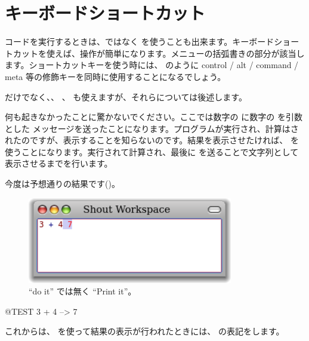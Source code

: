 \documentclass[a4paper,10pt,twoside]{book}
\begin{document}
\section{キーボードショートカット}

コードを実行するときは、\actclick ではなく を使うことも出来ます。キーボードショートカットを使えば、操作が簡単になります。メニューの括弧書きの部分が該当します。ショートカットキーを使う時には、 のように control / alt / command / meta 等の修飾キーを同時に使用することになるでしょう。



 だけでなく、、 、  も使えますが、それらについては後述します。


何も起きなかったことに驚かないでください。ここでは数字の  に数字の  を引数とした \ct{+} メッセージを送ったことになります。プログラムが実行され、計算はされたのですが、表示することを知らないのです。結果を表示させたければ、 を使うことになります。実行されて計算され、最後に  を送ることで文字列として表示させるまでを行います。

今度は予想通りの結果です()。

\begin{figure}[htb]
\centerline {\includegraphics[width=0.8\textwidth]{PrintIt}}
\caption{``do it'' では無く ``Print it''。}
\end{figure}

\begin{code}{@TEST}
3 + 4 --> 7
\end{code}
\noindent
これからは、 を使って結果の表示が行われたときには、\ct{-->} の表記をします。
\end{document}
